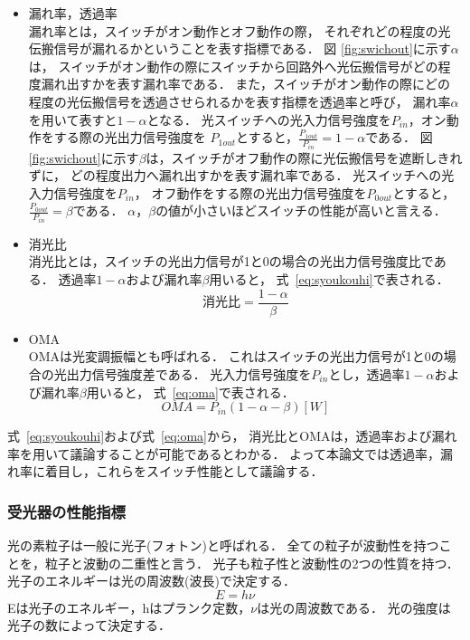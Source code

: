 \begin{itemize}
\item 漏れ率，透過率\\
漏れ率とは，スイッチがオン動作とオフ動作の際，
それぞれどの程度の光伝搬信号が漏れるかということを表す指標である．
図 \ref{fig:swichout}に示す$\alpha $は，
スイッチがオン動作の際にスイッチから回路外へ光伝搬信号がどの程度漏れ出すかを表す漏れ率である．
また，スイッチがオン動作の際にどの程度の光伝搬信号を透過させられるかを表す指標を透過率と呼び，
漏れ率$\alpha$を用いて表すと$1- \alpha$となる．
光スイッチへの光入力信号強度を$P_{in}$，オン動作をする際の光出力信号強度を
$P_{1out}$とすると，$\frac{P_{1out}}{P_{in}}=1- \alpha$である．
図 \ref{fig:swichout}に示す$\beta $は，スイッチがオフ動作の際に光伝搬信号を遮断しきれずに，
どの程度出力へ漏れ出すかを表す漏れ率である．
光スイッチへの光入力信号強度を$P_{in}$，
オフ動作をする際の光出力信号強度を$P_{0out}$とすると，
$\frac{P_{0out}}{P_{in}}=\beta$である．
$\alpha $，$ \beta $の値が小さいほどスイッチの性能が高いと言える．
\item 消光比\\
消光比とは，スイッチの光出力信号が1と0の場合の光出力信号強度比である．
透過率$1- \alpha$および漏れ率$\beta $用いると，
式~\eqref{eq:syoukouhi}で表される．
\begin{equation}
消光比= \frac{1- \alpha}{\beta}
\label{eq:syoukouhi}
\end{equation}
\item OMA\\
OMAは光変調振幅とも呼ばれる．
これはスイッチの光出力信号が1と0の場合の光出力信号強度差である．
光入力信号強度を$P_{in}$とし，透過率$1- \alpha$および漏れ率$\beta $用いると，
式~\eqref{eq:oma}で表される．
\begin{equation}
OMA = P_{in}(1- \alpha - \beta)[W]
\label{eq:oma}
\end{equation}
\end{itemize}
式~\eqref{eq:syoukouhi}および式~\eqref{eq:oma}から，
消光比とOMAは，透過率および漏れ率を用いて議論することが可能であるとわかる．
よって本論文では透過率，漏れ率に着目し，これらをスイッチ性能として議論する．

\subsubsection{受光器の性能指標}
光の素粒子は一般に光子(フォトン)と呼ばれる．
全ての粒子が波動性を持つことを，粒子と波動の二重性と言う．
光子も粒子性と波動性の2つの性質を持つ\cite{大津}．
光子のエネルギーは光の周波数(波長)で決定する．
\begin{equation}
E = h \nu \label{eq:hikarienergy}
\end{equation}
Eは光子のエネルギー，hはプランク定数，$\nu$は光の周波数である．
光の強度は光子の数によって決定する．

